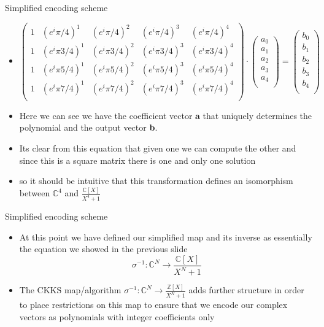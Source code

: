 \documentclass{beamer}
\begin{document}
\begin{frame}{Simplified encoding scheme}
	\begin{itemize}[<+->]
	\item 
		\begin{center}
			\[
			\begin{pmatrix}
				1 & (e^i\pi/4)^1 &  (e^i\pi/4)^2 &  (e^i\pi/4)^3 & (e^i\pi/4)^4\\  
				1 & (e^i\pi 3/4)^1 &  (e^i\pi 3/4)^2 &  (e^i\pi 3/4)^3 & (e^i\pi 3/4)^4\\  
				1 & (e^i\pi 5/4)^1 &  (e^i\pi 5/4)^2 &  (e^i\pi 5/4)^3 & (e^i\pi 5/4)^4\\  
				1 & (e^i\pi 7/4)^1 &  (e^i\pi 7/4)^2 &  (e^i\pi 7/4)^3 & (e^i\pi 7/4)^4\\  
			\end{pmatrix} \cdot 
			\begin{pmatrix}
				a_0\\
				a_1\\
				a_2\\
				a_3\\
				a_4\\
			\end{pmatrix} =
			\begin{pmatrix}
				b_0\\
				b_1\\
				b_2\\
				b_3\\
				b_4\\
			\end{pmatrix}
			\]
		\end{center}
		\item Here we can see we have the coefficient vector {\bf a} that uniquely determines the polynomial
		and the output vector {\bf b}. 
		\item Its clear from this equation that given one we can compute the other
		and since this is a square matrix there is one and only one solution
		\item so it should be intuitive that this transformation defines an isomorphism between $\mathbb{C}^4$ and $\frac{\mathbb{C}[X]}{X^4 + 1}$
	\end{itemize}
\end{frame}

\begin{frame}{Simplified encoding scheme}
	\begin{itemize}[<+->]
		\item At this point we have defined our simplified map and its inverse as essentially the equation we showed
		in the previous slide
		$$\sigma^{-1} : \mathbb{C}^N \to \frac{\mathbb{C}[X]}{X^N + 1}$$
		\item The CKKS map/algorithm $\sigma^{-1} : \mathbb{C}^N \to \frac{\mathbb{Z}[X]}{X^N + 1}$ adds further structure
		in order to place restrictions on this map to ensure that we encode our complex vectors as polynomials with
		integer coefficients only


	\end{itemize}
\end{frame}
\end{document}
